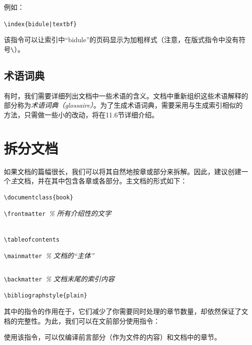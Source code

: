 例如：

\begin{dmd}
\verb+\index{bidule|textbf}+
\end{dmd}

该指令可以让索引中“bidule”的页码显示为加粗样式（注意，在版式指令中没有符号\verb|\|）。

\subsection{术语词典}

有时，我们需要详细列出文档中一些术语的含义。文档中重新组织这些术语解释的部分称为\emph{术语词典（glossaire）}。为了生成术语词典，需要采用与生成索引相似的方法，只需做一些小的改动，将在11.6节详细介绍。

\section{拆分文档}

如果文档的篇幅很长，我们可以将其自然地按章或部分来拆解。因此，建议创建一个\emph{主}文档，并在其中包含各章或各部分。主文档的形式如下：

\begin{dmd}
\begin{verbatim}
\documentclass{book}

\end{verbatim}
\verb+\frontmatter +\textsl{\% 所有介绍性的文字}
\begin{verbatim}

\tableofcontents\end{verbatim}
\verb+\mainmatter +\textsl{\% 文档的“主体”}
\begin{verbatim}

\end{verbatim}
\verb+\backmatter +\textsl{\% 文档末尾的索引内容}
\begin{verbatim}
\bibliographstyle{plain} 

\end{verbatim}
\end{dmd}

其中的指令\verb||的作用在于，它们减少了你需要同时处理的章节数量，却依然保证了文档的完整性。为此，我们可以在文前部分使用指令\verb||：

\begin{dmd}
\verb||
\end{dmd}

使用该指令，可以仅编译前言部分（作为文件的内容）和文档中的章节。

